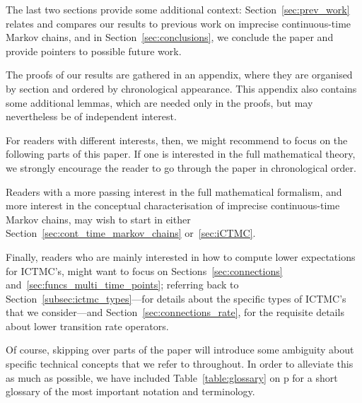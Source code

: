 \documentclass[10pt,a4paper]{paper}
\theoremstyle{definition}
\newcommand{\placeref}[1]{p\pageref{#1}}
\begin{document}
The last two sections provide some additional context: Section~\ref{sec:prev_work} relates and compares our results to previous work on imprecise continuous-time Markov chains, and in
Section~\ref{sec:conclusions}, we conclude the paper and provide pointers to possible future work. 

The proofs of our results are gathered in an appendix, where they are organised by section and ordered by chronological appearance. This appendix also contains some additional lemmas, which are needed only in the proofs, but may nevertheless be of independent interest.

For readers with different interests, then, we might recommend to focus on the following parts of this paper. If one is interested in the full mathematical theory, we strongly encourage the reader to go through the paper in chronological order.

Readers with a more passing interest in the full mathematical formalism, and more interest in the conceptual characterisation of imprecise continuous-time Markov chains, may wish to start in either Section~\ref{sec:cont_time_markov_chains} or~\ref{sec:iCTMC}.

Finally, readers who are mainly interested in how to compute lower expectations for ICTMC's, might want to focus on Sections~\ref{sec:connections} and~\ref{sec:funcs_multi_time_points}; referring back to Section~\ref{subsec:ictmc_types}---for details about the specific types of ICTMC's that we consider---and Section~\ref{sec:connections_rate}, for the requisite details about lower transition rate operators.

Of course, skipping over parts of the paper will introduce some ambiguity about specific technical concepts that we refer to throughout. In order to alleviate this as much as possible, we have included Table~\ref{table:glossary} on \placeref{table:glossary} for a short glossary of the most important notation and terminology.
\end{document}
